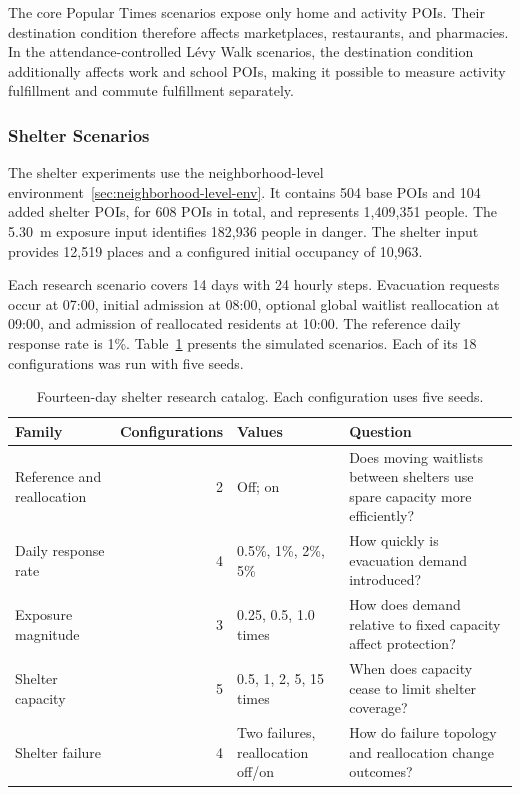 The core Popular Times scenarios expose only home and activity POIs. Their destination condition therefore affects marketplaces, restaurants, and pharmacies. In the attendance-controlled L\'evy Walk scenarios, the destination condition additionally affects work and school POIs, making it possible to measure activity fulfillment and commute fulfillment separately.

\subsubsection{Shelter Scenarios}

The shelter experiments use the neighborhood-level environment~\ref{sec:neighborhood-level-env}. It contains 504 base POIs and 104 added shelter POIs, for 608 POIs in total, and represents 1,409,351 people. The 5.30~m exposure input identifies 182,936 people in danger. The shelter input provides 12,519 places and a configured initial occupancy of 10,963.


Each research scenario covers 14 days with 24 hourly steps. Evacuation requests occur at 07:00, initial admission at 08:00, optional global waitlist reallocation at 09:00, and admission of reallocated residents at 10:00. The reference daily response rate is 1\%. Table~\ref{tbl:shelter_scenario_families} presents the simulated scenarios. Each of its 18 configurations was run with five seeds.

\begin{table}[ht]
\centering
\footnotesize
\caption{Fourteen-day shelter research catalog. Each configuration uses five seeds.}
\label{tbl:shelter_scenario_families}
\begin{tabularx}{\linewidth}{@{}lrlX@{}}
\toprule
\textbf{Family} & \textbf{Configurations} & \textbf{Values} & \textbf{Question} \\
\midrule
Reference and reallocation & 2 & Off; on & Does moving waitlists between shelters use spare capacity more efficiently? \\
Daily response rate & 4 & 0.5\%, 1\%, 2\%, 5\% & How quickly is evacuation demand introduced? \\
Exposure magnitude & 3 & 0.25, 0.5, 1.0 times & How does demand relative to fixed capacity affect protection? \\
Shelter capacity & 5 & 0.5, 1, 2, 5, 15 times & When does capacity cease to limit shelter coverage? \\
Shelter failure & 4 & Two failures, reallocation off/on & How do failure topology and reallocation change outcomes? \\
\bottomrule
\end{tabularx}
\end{table}

